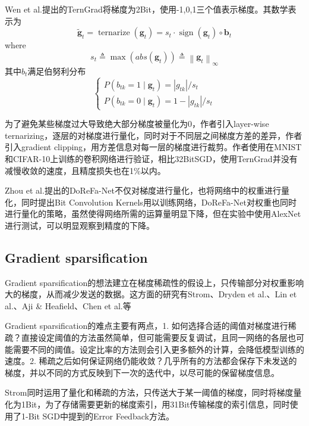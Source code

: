 \documentclass[11pt,onecolumn,letterpaper]{article}
\begin{document}
    Wen et al.\cite{Wen}提出的TernGrad将梯度为2Bit，使用-1,0,1三个值表示梯度。其数学表示为
    \[
        \tilde{\boldsymbol{g}}_{t}=\operatorname{ternarize}\left(\boldsymbol{g}_{t}\right)=s_{t} \cdot \operatorname{sign}\left(\boldsymbol{g}_{t}\right) \circ \boldsymbol{b}_{t}
    \]
    where
    \[
        s_{t} \triangleq \max \left(a b s\left(\boldsymbol{g}_{t}\right)\right) \triangleq\left\|\boldsymbol{g}_{t}\right\|_{\infty}
    \]
    其中$b_t$满足伯努利分布
    \[
        \left\{\begin{array}{l}
        P\left(b_{t k}=1 \mid \boldsymbol{g}_{t}\right)=\left|g_{t k}\right| / s_{t} \\
        P\left(b_{t k}=0 \mid \boldsymbol{g}_{t}\right)=1-\left|g_{t k}\right| / s_{t}
        \end{array}\right.
    \]

    为了避免某些梯度过大导致绝大部分梯度被量化为0，作者引入layer-wise ternarizing，逐层的对梯度进行量化，同时对于不同层之间梯度方差的差异，作者引入gradient clipping，用方差信息对每一层的梯度进行裁剪。作者使用在MNIST和CIFAR-10上训练的卷积网络进行验证，相比32BitSGD，使用TernGrad并没有减慢收敛的速度，且精度损失也在1\%以内。

    Zhou et al.\cite{Zhou}提出的DoReFa-Net不仅对梯度进行量化，也将网络中的权重进行量化，同时提出Bit Convolution Kernels用以训练网络，DoReFa-Net对权重也同时进行量化的策略，虽然使得网络所需的运算量明显下降，但在实验中使用AlexNet进行测试，可以明显观察到精度的下降。



    \subsection{Gradient sparsification}
    Gradient sparsification的想法建立在梯度稀疏性的假设上，只传输部分对权重影响大的梯度，从而减少发送的数据。这方面的研究有Strom\cite{International}、Dryden et al.\cite{Dryden2016}、Lin et al.\cite{Lin2017}、Aji \& Heafield\cite{Aji2017}、Chen et al.\cite{Chen}等

    Gradient sparsification的难点主要有两点，1. 如何选择合适的阈值对梯度进行稀疏？直接设定阈值的方法虽然简单，但可能需要反复调试，且同一网络的各层也可能需要不同的阈值。设定比率的方法则会引入更多额外的计算，会降低模型训练的速度。2. 稀疏之后如何保证网络仍能收敛？几乎所有的方法都会保存下未发送的梯度，并以不同的方式反映到下一次的迭代中，以尽可能的保留梯度信息。

    Strom\cite{International}同时运用了量化和稀疏的方法，只传送大于某一阈值的梯度，同时将梯度量化为1Bit，为了存储需要更新的梯度索引，用31Bit传输梯度的索引信息，同时使用了1-Bit SGD中提到的Error Feedback方法。
\end{document}
